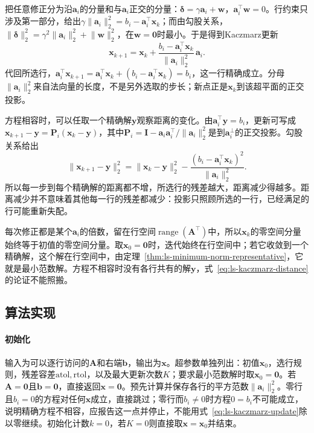 把任意修正分为沿$\bm a_i$的分量和与$\bm a_i$正交的分量：$\bm\delta=\gamma\bm a_i+\bm w$，$\bm a_i^\top\bm w=0$。行约束只涉及第一部分，给出$\gamma\lVert\bm a_i\rVert_2^2=b_i-\bm a_i^\top\bm x_k$；而由勾股关系，$\lVert\bm\delta\rVert_2^2=\gamma^2\lVert\bm a_i\rVert_2^2+\lVert\bm w\rVert_2^2$，在$\bm w=\bm0$时最小。于是得到Kaczmarz更新
\begin{equation}
 \bm x_{k+1}=\bm x_k+\frac{b_i-\bm a_i^\top\bm x_k}{\lVert\bm a_i\rVert_2^2}\,\bm a_i .
 \label{eq:ls-kaczmarz-update}
\end{equation}
代回所选行，$\bm a_i^\top\bm x_{k+1}=\bm a_i^\top\bm x_k+(b_i-\bm a_i^\top\bm x_k)=b_i$，这一行精确成立。分母$\lVert\bm a_i\rVert_2^2$来自法向量的长度，不是另外选取的步长；新点正是$\bm x_k$到该超平面的正交投影。

方程相容时，可以任取一个精确解$\bm y$观察距离的变化。由$\bm a_i^\top\bm y=b_i$，更新可写成$\bm x_{k+1}-\bm y=\bm P_i(\bm x_k-\bm y)$，其中$\bm P_i=\bm I-\bm a_i\bm a_i^\top/\lVert\bm a_i\rVert_2^2$是到$\bm a_i^\perp$的正交投影。勾股关系给出
\begin{equation}
 \lVert\bm x_{k+1}-\bm y\rVert_2^2=\lVert\bm x_k-\bm y\rVert_2^2-\frac{(b_i-\bm a_i^\top\bm x_k)^2}{\lVert\bm a_i\rVert_2^2}.
 \label{eq:ls-kaczmarz-distance}
\end{equation}
所以每一步到每个精确解的距离都不增，所选行的残差越大，距离减少得越多。距离减少并不意味着其他每一行的残差都减少：投影只照顾所选的一行，已经满足的行可能重新失配。

每次修正都是某个$\bm a_i$的倍数，留在行空间$\operatorname{range}(\bm A^\top)$中，所以$\bm x_k$的零空间分量始终等于初值的零空间分量。取$\bm x_0=\bm0$时，迭代始终在行空间中；若它收敛到一个精确解，这个解在行空间中，由定理~\ref{thm:ls-minimum-norm-representative}，它就是最小范数解。方程不相容时没有各行共有的解$\bm y$，式~\eqref{eq:ls-kaczmarz-distance}的论证不能照搬。

\subsection{算法实现}

\paragraph{初始化}
输入为可以逐行访问的$\bm A$和右端$\bm b$，输出为$\bm x$。超参数单独列出：初值$\bm x_0$，选行规则，残差容差$\mathrm{atol},\mathrm{rtol}$，以及最大更新次数$K$；要求最小范数解时取$\bm x_0=\bm 0$。若$\bm A=\bm0$且$\bm b=\bm0$，直接返回$\bm x=\bm0$。预先计算并保存各行的平方范数$\lVert\bm a_i\rVert_2^2$。零行且$b_i=0$的方程对任何$\bm x$成立，直接跳过；零行而$b_i\neq0$时方程$0=b_i$不可能成立，说明精确方程不相容，应报告这一点并停止，不能用式~\eqref{eq:ls-kaczmarz-update}除以零继续。初始化计数$k=0$，若$K=0$则直接取$\bm x=\bm x_0$并结束。

